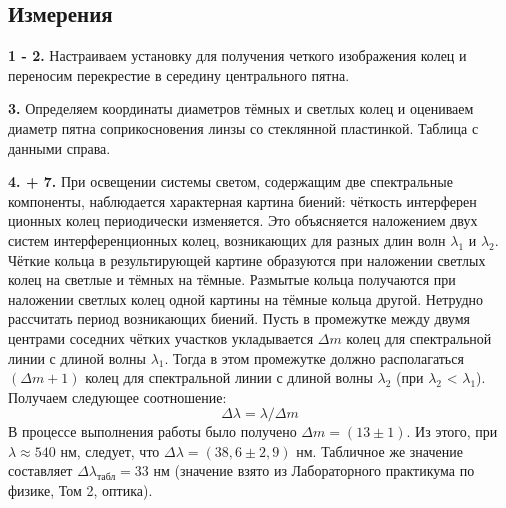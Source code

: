 \documentclass[a4paper,12pt]{extarticle}
\begin{document}
\subsection*{Измерения}
\begin{minipage}[]{0.6\textwidth} 
    \textbf{1 - 2.} Настраиваем установку для получения четкого изображения колец и переносим перекрестие в середину центрального пятна.

    \textbf{3.} Определяем координаты диаметров тёмных и светлых колец и оцениваем диаметр пятна соприкосновения линзы со стеклянной пластинкой. Таблица с данными справа.

    \textbf{4. + 7.} При освещении системы светом, содержащим две спектральные компоненты, наблюдается характерная картина биений: чёткость интерферен ционных колец периодически изменяется. Это объясняется наложением двух систем интерференционных колец, возникающих для разных длин волн $\lambda_1$ и $\lambda_2$. Чёткие кольца в результирующей картине образуются при наложении светлых колец на светлые и тёмных на тёмные. Размытые кольца получаются при наложении светлых колец одной картины на тёмные кольца другой. Нетрудно рассчитать период возникающих биений. Пусть в промежутке между двумя центрами соседних чётких участков укладывается $\Delta m$ колец для спектральной линии с длиной волны $\lambda_1$. Тогда в этом промежутке должно располагаться $(\Delta m + 1)$ колец для спектральной линии с длиной волны $\lambda_2$ (при $\lambda_2$ < $\lambda_1$).
Получаем следующее соотношение:
\begin{equation}
    \Delta \lambda = \lambda / \Delta m
    \label{m}
\end{equation}
В процессе выполнения работы было получено $\Delta m = (13 \pm 1)$. Из этого, при $\lambda \approx 540$ нм, следует, что $\Delta \lambda = (38,6 \pm 2,9 )$ нм. Табличное же значение составляет $\Delta \lambda_{\text{табл}} = 33$ нм (значение взято из Лабораторного практикума по физике, Том 2, оптика).
\end{minipage}%
\hfill 
\end{document}
